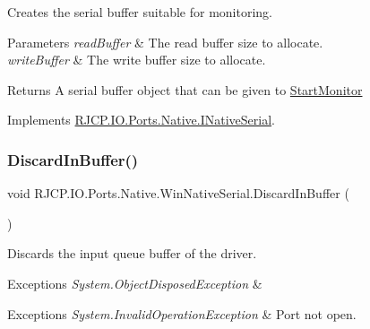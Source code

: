 Creates the serial buffer suitable for monitoring. 


\begin{DoxyParams}{Parameters}
{\em read\+Buffer} & The read buffer size to allocate.\\
\hline
{\em write\+Buffer} & The write buffer size to allocate.\\
\hline
\end{DoxyParams}
\begin{DoxyReturn}{Returns}
A serial buffer object that can be given to \mbox{\hyperlink{class_r_j_c_p_1_1_i_o_1_1_ports_1_1_native_1_1_win_native_serial_af8513c10fdf373932ec07a2bb033d0c4}{Start\+Monitor}}
\end{DoxyReturn}


Implements \mbox{\hyperlink{interface_r_j_c_p_1_1_i_o_1_1_ports_1_1_native_1_1_i_native_serial_a15155443dbfd8aead3cc4ade53b1fa2b}{R\+J\+C\+P.\+I\+O.\+Ports.\+Native.\+I\+Native\+Serial}}.

\mbox{\label{class_r_j_c_p_1_1_i_o_1_1_ports_1_1_native_1_1_win_native_serial_a1649b6bcb63367419fc2c1701e9cab94}} 
\subsubsection{\texorpdfstring{DiscardInBuffer()}{DiscardInBuffer()}}
{\footnotesize\ttfamily void R\+J\+C\+P.\+I\+O.\+Ports.\+Native.\+Win\+Native\+Serial.\+Discard\+In\+Buffer (\begin{DoxyParamCaption}{ }\end{DoxyParamCaption})}



Discards the input queue buffer of the driver. 


\begin{DoxyExceptions}{Exceptions}
{\em System.\+Object\+Disposed\+Exception} & 
\begin{DoxyExceptions}{Exceptions}
{\em System.\+Invalid\+Operation\+Exception} & Port not open.\\
\hline
\end{DoxyExceptions}
\\
\hline
\end{DoxyExceptions}


